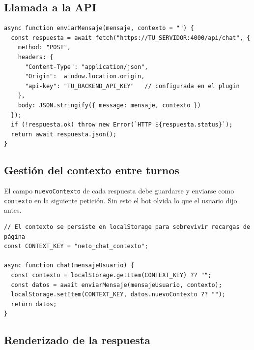\documentclass[12pt, a4paper]{article}
\begin{document}
\subsection{Llamada a la API}

\begin{lstlisting}[style=js, caption={Función básica de llamada al backend}]
async function enviarMensaje(mensaje, contexto = "") {
  const respuesta = await fetch("https://TU_SERVIDOR:4000/api/chat", {
    method: "POST",
    headers: {
      "Content-Type": "application/json",
      "Origin":  window.location.origin,
      "api-key": "TU_BACKEND_API_KEY"   // configurada en el plugin
    },
    body: JSON.stringify({ message: mensaje, contexto })
  });
  if (!respuesta.ok) throw new Error(`HTTP ${respuesta.status}`);
  return await respuesta.json();
}
\end{lstlisting}

\subsection{Gestión del contexto entre turnos}

El campo \texttt{nuevoContexto} de cada respuesta debe guardarse y enviarse como \texttt{contexto} en la siguiente petición. Sin esto el bot olvida lo que el usuario dijo antes.

\begin{lstlisting}[style=js, caption={Gestión del contexto conversacional}]
// El contexto se persiste en localStorage para sobrevivir recargas de página
const CONTEXT_KEY = "neto_chat_contexto";

async function chat(mensajeUsuario) {
  const contexto = localStorage.getItem(CONTEXT_KEY) ?? "";
  const datos = await enviarMensaje(mensajeUsuario, contexto);
  localStorage.setItem(CONTEXT_KEY, datos.nuevoContexto ?? "");
  return datos;
}
\end{lstlisting}

\subsection{Renderizado de la respuesta}
\end{document}
